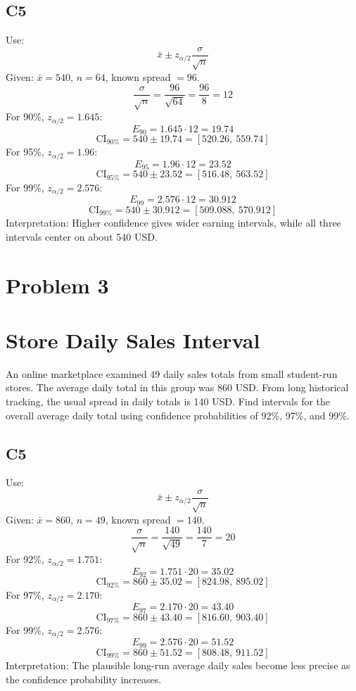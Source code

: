 \begin{ExamProblems}
		\subsection*{C5}
		Use:
		\[
		\bar{x} \pm z_{\alpha/2}\frac{\sigma}{\sqrt{n}}
		\]
		Given: $\bar{x}=540$, $n=64$, known spread $=96$.
		\[
		\frac{\sigma}{\sqrt{n}}=\frac{96}{\sqrt{64}}=\frac{96}{8}=12
		\]
		For 90\%, $z_{\alpha/2}=1.645$:
		\[
		E_{90}=1.645\cdot 12=19.74
		\]
		\[
		\text{CI}_{90\%}=540\pm 19.74=[520.26,\ 559.74]
		\]
		For 95\%, $z_{\alpha/2}=1.96$:
		\[
		E_{95}=1.96\cdot 12=23.52
		\]
		\[
		\text{CI}_{95\%}=540\pm 23.52=[516.48,\ 563.52]
		\]
		For 99\%, $z_{\alpha/2}=2.576$:
		\[
		E_{99}=2.576\cdot 12=30.912
		\]
		\[
		\text{CI}_{99\%}=540\pm 30.912=[509.088,\ 570.912]
		\]
		Interpretation: Higher confidence gives wider earning intervals, while all three intervals center on about 540 USD.

		\newpage
		\item
		\section{Problem 3}
		\section{Store Daily Sales Interval}
		An online marketplace examined 49 daily sales totals from small student-run stores.
		The average daily total in this group was 860 USD.
		From long historical tracking, the usual spread in daily totals is 140 USD.
		Find intervals for the overall average daily total using confidence probabilities of 92\%, 97\%, and 99\%.

		\subsection*{C5}
		Use:
		\[
		\bar{x} \pm z_{\alpha/2}\frac{\sigma}{\sqrt{n}}
		\]
		Given: $\bar{x}=860$, $n=49$, known spread $=140$.
		\[
		\frac{\sigma}{\sqrt{n}}=\frac{140}{\sqrt{49}}=\frac{140}{7}=20
		\]
		For 92\%, $z_{\alpha/2}=1.751$:
		\[
		E_{92}=1.751\cdot 20=35.02
		\]
		\[
		\text{CI}_{92\%}=860\pm 35.02=[824.98,\ 895.02]
		\]
		For 97\%, $z_{\alpha/2}=2.170$:
		\[
		E_{97}=2.170\cdot 20=43.40
		\]
		\[
		\text{CI}_{97\%}=860\pm 43.40=[816.60,\ 903.40]
		\]
		For 99\%, $z_{\alpha/2}=2.576$:
		\[
		E_{99}=2.576\cdot 20=51.52
		\]
		\[
		\text{CI}_{99\%}=860\pm 51.52=[808.48,\ 911.52]
		\]
		Interpretation: The plausible long-run average daily sales become less precise as the confidence probability increases.


\end{ExamProblems}
